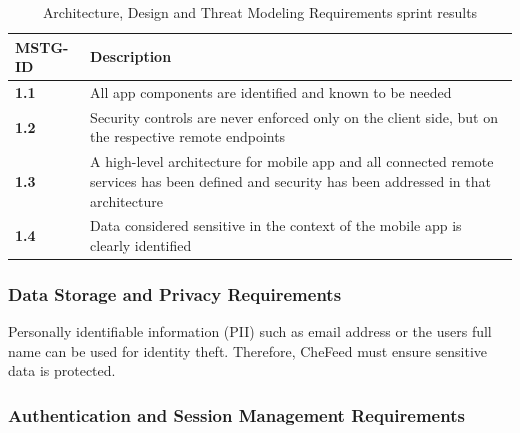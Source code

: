 \begin{table}
    \caption{Architecture, Design and Threat Modeling Requirements sprint results}
    \label{tab:v1-sprint-results}
    \begin{tabulary}{1.0\textwidth}{|L|L|}
        \hline
        \textbf{MSTG-ID} & \textbf{Description} \\
        \hline
        \textbf{1.1} & All app components are identified and known to be needed \\
        \hline
        \textbf{1.2} & Security controls are never enforced only on the client side, but on the respective remote endpoints \\
        \hline
        \textbf{1.3} & A high-level architecture for mobile app and all connected remote services has been defined and security has been addressed in that architecture \\
        \hline
        \textbf{1.4} & Data considered sensitive in the context of the mobile app is clearly identified \\
        \hline
    \end{tabulary}
\end{table}

\subsubsection{Data Storage and Privacy Requirements}
Personally identifiable information (PII) such as email address or the users full name can be used for identity theft. Therefore, CheFeed must ensure sensitive data is protected. 

\subsubsection{Authentication and Session Management Requirements}

